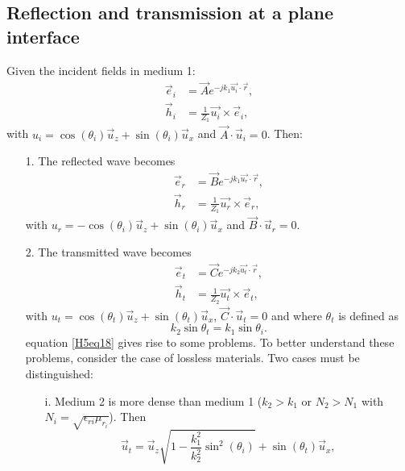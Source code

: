 \documentclass[a4paper, 10pt]{article}
\begin{document}
    \subsection{Reflection and transmission at a plane interface}
    Given the incident fields in medium 1:
    \begin{align}
        \vec{e}_i&=\vec{A}e^{-jk_1\vec{u_i}\cdot \vec{r}} \label{H5eq12},\\
        \vec{h}_i&=\frac{1}{Z_1}\vec{u_i}\times\vec{e}_i \label{H5eq13},
    \end{align}
    with $u_i = \cos(\theta_i)\vec{u}_z+\sin(\theta_i)\vec{u}_x$ and $\vec{A}\cdot \vec{u}_i = 0$. Then:
    \begin{itemize}
        \item[1.] The reflected wave becomes
        \begin{align}
            \vec{e}_r&=\vec{B}e^{-jk_1\vec{u_r}\cdot \vec{r}} \label{H5eq14},\\
            \vec{h}_r&=\frac{1}{Z_1}\vec{u_r}\times \vec{e}_r \label{H5eq15},
        \end{align}
        with $u_r = -\cos(\theta_i)\vec{u}_z+\sin(\theta_i)\vec{u}_x$ and $\vec{B}\cdot \vec{u}_r = 0$.
        \item[2.] The transmitted wave becomes
        \begin{align}
            \vec{e}_t&=\vec{C}e^{-jk_2\vec{u_t}\cdot \vec{r}} \label{H5eq16},\\
            \vec{h}_t&=\frac{1}{Z_2}\vec{u_t}\times \vec{e}_t \label{H5eq17},
        \end{align}
        with $u_t = \cos(\theta_t)\vec{u}_z+\sin(\theta_t)\vec{u}_x$, $\vec{C}\cdot \vec{u}_t = 0$ and where $\theta_t$ is defined as
        \begin{equation}
            k_2\sin{\theta_t} = k_1\sin{\theta_i} \label{H5eq18}.
        \end{equation}
        equation \ref{H5eq18} gives rise to some problems. To better understand these problems, consider the case of lossless materials.
        Two cases must be distinguished:
        \begin{itemize}
            \item[i.] Medium 2 is more dense than medium 1 ($k_2 > k_1$ or $N_2 > N_1$ with $N_i=\sqrt{\epsilon_{ri}\mu_{r_i}}$). Then
            \begin{equation}
                \vec{u}_t = \vec{u}_z\sqrt{1-\frac{k^2_1}{k^2_2}\sin^2(\theta_i)} + \sin(\theta_t)\vec{u}_x, \label{H5eq19}
            \end{equation}

\end{itemize}
\end{itemize}
\end{document}
